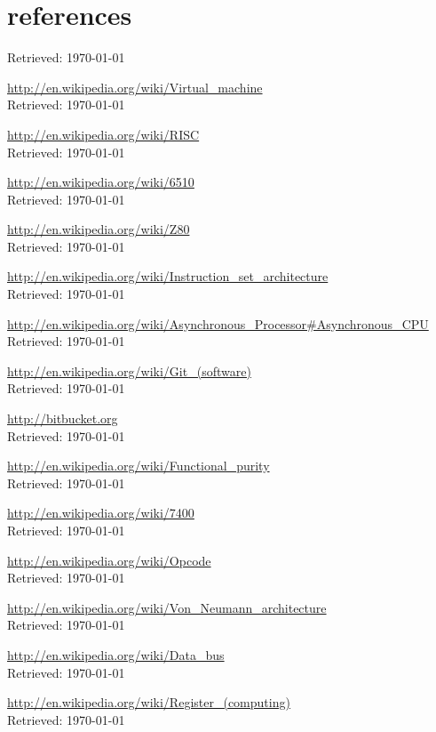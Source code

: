 \documentclass{article}
\begin{document}
\section{references}
\begin{thebibliography}{}

\bibitem{}
{\url{}
Retrieved: \today}

{\url{http://en.wikipedia.org/wiki/Virtual_machine}\\
Retrieved: \today}

{\url{http://en.wikipedia.org/wiki/RISC}\\
Retrieved: \today}

{\url{http://en.wikipedia.org/wiki/6510}\\
Retrieved: \today}

{\url{http://en.wikipedia.org/wiki/Z80}\\
Retrieved: \today}

{\url{http://en.wikipedia.org/wiki/Instruction_set_architecture}\\
Retrieved: \today}

{\url{http://en.wikipedia.org/wiki/Asynchronous_Processor#Asynchronous_CPU}\\
Retrieved: \today}

{\url{http://en.wikipedia.org/wiki/Git_(software)}\\
Retrieved: \today}

{\url{http://bitbucket.org}\\
Retrieved: \today}

{\url{http://en.wikipedia.org/wiki/Functional_purity}\\
Retrieved: \today}

{\url{http://en.wikipedia.org/wiki/7400}\\
Retrieved: \today}

{\url{http://en.wikipedia.org/wiki/Opcode}\\
Retrieved: \today}

{\url{http://en.wikipedia.org/wiki/Von_Neumann_architecture}\\
Retrieved: \today}

{\url{http://en.wikipedia.org/wiki/Data_bus}\\
Retrieved: \today}

{\url{http://en.wikipedia.org/wiki/Register_(computing)}\\
Retrieved: \today}


\end{thebibliography}
\end{document}
